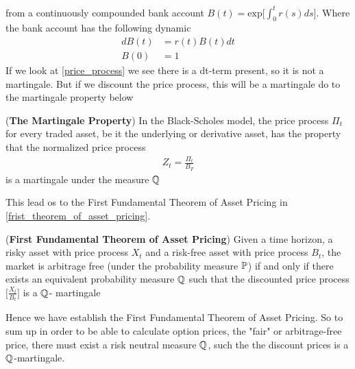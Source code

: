 from a continuously compounded bank account $B(t)= \text{exp} \Big[\int_{0}^{t}r(s)ds \Big]$.
Where the bank account has the following dynamic
\begin{align*}
    dB(t) &= r(t)B(t) dt \\
    B(0) & = 1
\end{align*}
If we look at \autoref{price_process} we see there is a dt-term present, so it is not a martingale.
But if we discount the price process, this will be a martingale do to the martingale property below
\begin{proposition}
    (\textbf{The Martingale Property}) In the Black-Scholes model, the price process $\Pi_t$
    for every traded asset, be it the underlying or derivative asset, has the property that the normalized price process
    \begin{align*}
        Z_t = \frac{\Pi_t}{B_T}
    \end{align*}
    is a martingale under the measure $\mathbb{Q}$ \cite{Bjork}
\end{proposition}
\noindent 
This lead os to the First Fundamental Theorem of Asset Pricing in \autoref{frist_theorem_of_asset_pricing}.
\begin{theorem}
    (\textbf{First Fundamental Theorem of Asset Pricing})
    Given a time horizon, a risky asset with price process $X_t$ and a
    risk-free asset with price process $B_t$, the market is arbitrage free 
    (under the probability measure $\mathbb{P}$) if and only if there exists an 
    equivalent probability measure $\mathbb{Q}$ such that the discounted price process
    $\Big[\frac{X_t}{B_t}\Big]$  is a $\mathbb{Q}$- martingale \cite{Bjork}
    \label{frist_theorem_of_asset_pricing}
\end{theorem}
\noindent 
Hence we have establish the First Fundamental Theorem of Asset Pricing. So to sum up in order to be able to calculate
option prices, the "fair" or arbitrage-free price, there must exist a risk neutral measure $\mathbb{Q}$, such the the discount prices
is a $\mathbb{Q}$-martingale. 
